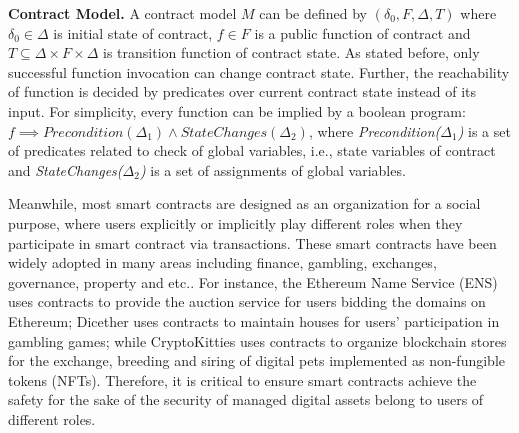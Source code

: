 \begin{definition}
	\label{def: contractmodel}
	\textbf{Contract Model.} 
	A contract model $\mathit{M}$ can be defined by $(\delta_0, F, \Delta, T)$ where $\delta_0 \in \Delta$ is initial state of contract, $f \in  F$ is a public function of contract and $T \subseteq \Delta \times F \times \Delta $ is transition function of contract state.
	As stated before, only successful function invocation can change contract state.
	Further, the reachability of function is decided by predicates over current contract state instead of its input. 
	For simplicity, every function can be implied by a boolean program: $f\implies Precondition(\Delta_1) \land StateChanges(\Delta_2)$,  where \textit{Precondition($\Delta_1$)} is a set of predicates related to check of global variables, i.e., state variables of contract and \textit{StateChanges($\Delta_2$)} is a set of assignments of global variables.
\end{definition}

Meanwhile, most smart contracts are designed as an organization for a social purpose, where users explicitly or implicitly play different roles 
when they participate in smart contract via transactions.
These smart contracts have been widely adopted in many areas including finance, gambling, exchanges, governance, property and etc..
For instance, the Ethereum Name Service (ENS) uses contracts to provide the auction service for users bidding the domains on Ethereum;
Dicether uses contracts to maintain houses for users' participation in gambling games;
while CryptoKitties uses contracts to organize blockchain stores for the exchange, breeding and siring of digital pets implemented as non-fungible tokens (NFTs). 
Therefore, it is critical to ensure smart contracts achieve the safety for the sake of the security of managed digital assets belong to users of different roles.